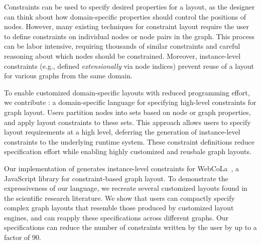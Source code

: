 Constraints can be used to specify desired properties for a layout, as 
the designer can think about how domain-specific properties should control 
the positions of nodes. However, many existing techniques
for constraint layout require the user to define constraints
on individual nodes or node pairs in the graph. This process can be labor
intensive, requiring thousands of similar constraints and careful reasoning
about which nodes should be constrained. Moreover, instance-level constraints 
(e.g., defined \emph{extensionally} via node indices) prevent
reuse of a layout for various graphs from the same domain.

To enable customized domain-specific layouts with reduced
programming effort, we contribute \projectname: a domain-specific language for
specifying high-level constraints for graph layout. Users partition nodes
into sets based on node or graph properties, and apply layout constraints
to these sets. This approach allows users to specify layout
requirements at a high level, deferring the generation of
instance-level constraints to the underlying runtime system. These constraint
definitions reduce specification effort while enabling highly
customized and reusbale graph layouts.

Our implementation of \projectname generates instance-level constraints for
WebCoLa~\cite{WebCoLa}, a JavaScript library for constraint-based graph
layout. To demonstrate the expressiveness of our language, we
recreate several customized layouts found in the scientific research 
literature. We
show that users can compactly specify complex graph layouts that resemble
those produced by customized layout engines, and can reapply these
specifications across different graphs. Our \projectname specifications
can reduce the number of constraints written by the user by up to a 
factor of 90.

